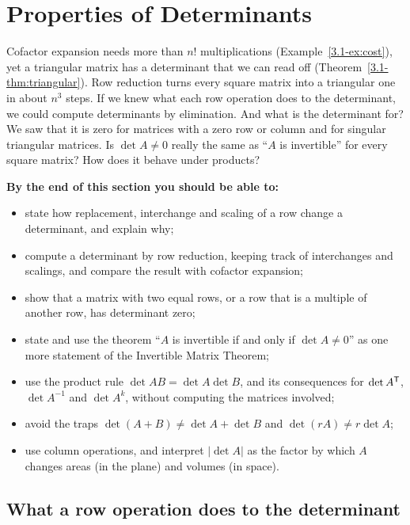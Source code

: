 \documentclass[11pt]{article}
\begin{document}
\section{Properties of Determinants}

\begin{guide}
Cofactor expansion needs more than $n!$ multiplications (Example~\ref{3.1-ex:cost}), yet a triangular matrix has a determinant that we can read off (Theorem~\ref{3.1-thm:triangular}). Row reduction turns every square matrix into a triangular one in about $n^3$ steps. If we knew what each row operation does to the determinant, we could compute determinants by elimination. And what is the determinant for? We saw that it is zero for matrices with a zero row or column and for singular triangular matrices. Is $\det A\neq0$ really the same as ``$A$ is invertible'' for every square matrix? How does it behave under products?
\end{guide}

\textbf{By the end of this section you should be able to:}
\begin{itemize}
  \item state how replacement, interchange and scaling of a row change a determinant, and explain why;
  \item compute a determinant by row reduction, keeping track of interchanges and scalings, and compare the result with cofactor expansion;
  \item show that a matrix with two equal rows, or a row that is a multiple of another row, has determinant zero;
  \item state and use the theorem ``$A$ is invertible if and only if $\det A\neq0$'' as one more statement of the Invertible Matrix Theorem;
  \item use the product rule $\det AB=\det A\det B$, and its consequences for $\det A^{\mathsf T}$, $\det A^{-1}$ and $\det A^k$, without computing the matrices involved;
  \item avoid the traps $\det(A+B)\neq\det A+\det B$ and $\det(rA)\neq r\det A$;
  \item use column operations, and interpret $|\det A|$ as the factor by which $A$ changes areas (in the plane) and volumes (in space).
\end{itemize}

\subsection*{What a row operation does to the determinant}
\end{document}
